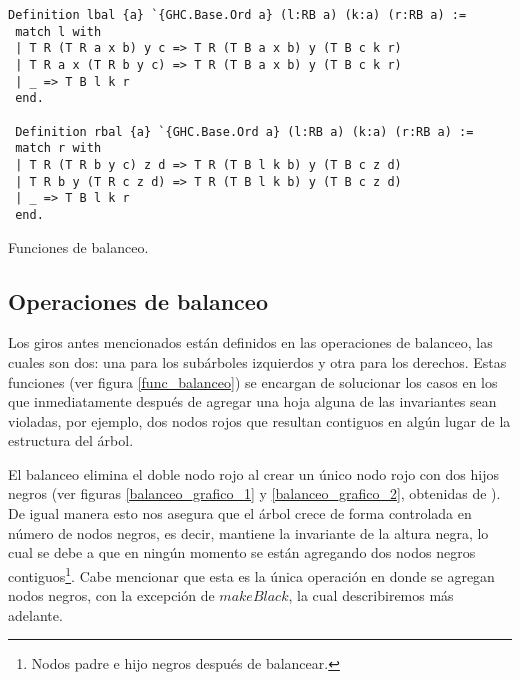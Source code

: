 \begin{listing}[!ht]
\centering
\captionsetup{justification=centering}
\begin{verbatim}
Definition lbal {a} `{GHC.Base.Ord a} (l:RB a) (k:a) (r:RB a) :=
 match l with
 | T R (T R a x b) y c => T R (T B a x b) y (T B c k r)
 | T R a x (T R b y c) => T R (T B a x b) y (T B c k r)
 | _ => T B l k r
 end.

 Definition rbal {a} `{GHC.Base.Ord a} (l:RB a) (k:a) (r:RB a) :=
 match r with
 | T R (T R b y c) z d => T R (T B l k b) y (T B c z d)
 | T R b y (T R c z d) => T R (T B l k b) y (T B c z d)
 | _ => T B l k r
 end.
\end{verbatim}
\caption{Funciones de balanceo.}
\label{func_balanceo}
\end{listing}

\subsection{Operaciones de balanceo}
\label{subsec_bal}

Los giros antes mencionados están definidos en las operaciones de balanceo, las cuales son dos: una 
para los subárboles izquierdos y otra para los derechos. Estas funciones (ver figura 
\ref{func_balanceo}) se encargan de solucionar los casos en los que inmediatamente después de 
agregar una hoja alguna de las invariantes sean violadas, por ejemplo, dos nodos rojos que resultan 
contiguos en algún lugar de la estructura del \'arbol.

El balanceo elimina el doble nodo rojo al crear un \'unico nodo rojo con dos hijos negros (ver figuras \ref{balanceo_grafico_1} y \ref{balanceo_grafico_2}, obtenidas de \cite{tesisG}). De 
igual manera esto nos asegura que el árbol crece de forma controlada en n\'umero de nodos negros, es
decir, mantiene la invariante de la altura negra, lo cual se debe a que en ningún momento se están 
agregando dos nodos negros contiguos\footnote{Nodos padre e hijo negros después de balancear.}. Cabe
 mencionar que esta es la única operación en donde se agregan nodos negros, con la excepción de 
 \hyperref[raiz_negra_func]{$makeBlack$}, la cual describiremos m\'as adelante.
 
